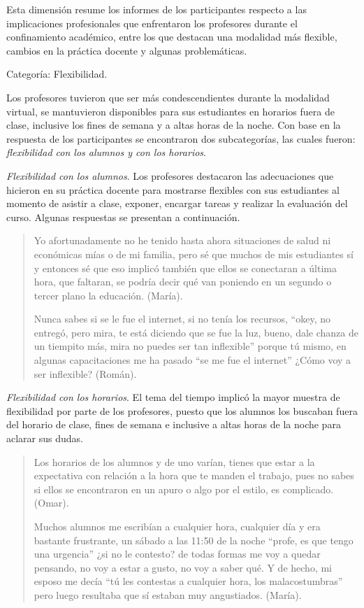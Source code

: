 \documentclass[spanish]{textolivre}
\begin{document}
Esta dimensión resume los informes de los participantes respecto a las implicaciones profesionales que enfrentaron los profesores durante el confinamiento académico, entre los que destacan una modalidad más flexible, cambios en la práctica docente y algunas problemáticas.

Categoría: Flexibilidad.

Los profesores tuvieron que ser más condescendientes durante la modalidad virtual, se mantuvieron disponibles para sus estudiantes en horarios fuera de clase, inclusive los fines de semana y a altas horas de la noche. Con base en la respuesta de los participantes se encontraron dos subcategorías, las cuales fueron: \textit{flexibilidad con los alumnos y con los horarios}.

\textit{Flexibilidad con los alumnos}. Los profesores destacaron las adecuaciones que hicieron en su práctica docente para mostrarse flexibles con sus estudiantes al momento de asistir a clase, exponer, encargar tareas y realizar la evaluación del curso. Algunas respuestas se presentan a continuación.

\begin{quote}
Yo afortunadamente no he tenido hasta ahora situaciones de salud ni económicas mías o de mi familia, pero sé que muchos de mis estudiantes sí y entonces sé que eso implicó también que ellos se conectaran a última hora, que faltaran, se podría decir qué van poniendo en un segundo o tercer plano la educación. (María).

   Nunca sabes si se le fue el internet, si no tenía los recursos, “okey, no entregó, pero mira, te está diciendo que se fue la luz, bueno, dale chanza de un tiempito más, mira no puedes ser tan inflexible” porque tú mismo, en algunas capacitaciones me ha pasado “se me fue el internet” ¿Cómo voy a ser inflexible? (Román). 
\end{quote}

\textit{Flexibilidad con los horarios}. El tema del tiempo implicó la mayor muestra de flexibilidad por parte de los profesores, puesto que los alumnos los buscaban fuera del horario de clase, fines de semana e inclusive a altas horas de la noche para aclarar sus dudas. 

\begin{quote}
Los horarios de los alumnos y de uno varían, tienes que estar a la expectativa con relación a la hora que te manden el trabajo, pues no sabes si ellos se encontraron en un apuro o algo por el estilo, es complicado. (Omar).   
 
    Muchos alumnos me escribían a cualquier hora, cualquier día y era bastante frustrante, un sábado a las 11:50 de la noche “profe, es que tengo una urgencia” ¿si no le contesto? de todas formas me voy a quedar pensando, no voy a estar a gusto, no voy a saber qué. Y de hecho, mi esposo me decía “tú les contestas a cualquier hora, los malacostumbras” pero luego resultaba que sí estaban muy angustiados. (María).
\end{quote}
\end{document}
